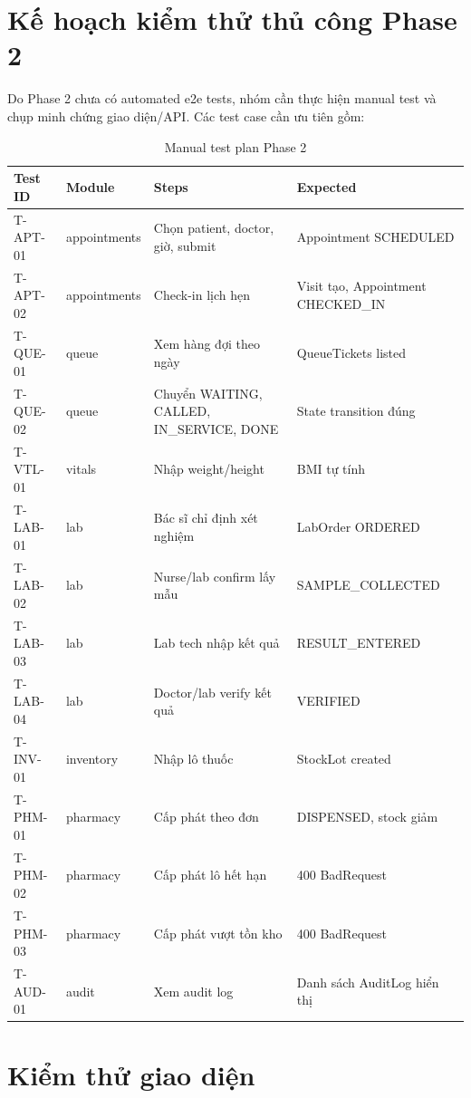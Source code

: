 \section{Kế hoạch kiểm thử thủ công Phase 2}

Do Phase 2 chưa có automated e2e tests, nhóm cần thực hiện manual test và chụp minh chứng giao diện/API. Các test case cần ưu tiên gồm:

\begin{longtable}{|p{2.5cm}|p{3cm}|p{5cm}|p{4.5cm}|}
\caption{Manual test plan Phase 2}\\
\hline
\textbf{Test ID} & \textbf{Module} & \textbf{Steps} & \textbf{Expected} \\
\hline
T-APT-01 & appointments & Chọn patient, doctor, giờ, submit & Appointment SCHEDULED \\
\hline
T-APT-02 & appointments & Check-in lịch hẹn & Visit tạo, Appointment CHECKED\_IN \\
\hline
T-QUE-01 & queue & Xem hàng đợi theo ngày & QueueTickets listed \\
\hline
T-QUE-02 & queue & Chuyển WAITING, CALLED, IN\_SERVICE, DONE & State transition đúng \\
\hline
T-VTL-01 & vitals & Nhập weight/height & BMI tự tính \\
\hline
T-LAB-01 & lab & Bác sĩ chỉ định xét nghiệm & LabOrder ORDERED \\
\hline
T-LAB-02 & lab & Nurse/lab confirm lấy mẫu & SAMPLE\_COLLECTED \\
\hline
T-LAB-03 & lab & Lab tech nhập kết quả & RESULT\_ENTERED \\
\hline
T-LAB-04 & lab & Doctor/lab verify kết quả & VERIFIED \\
\hline
T-INV-01 & inventory & Nhập lô thuốc & StockLot created \\
\hline
T-PHM-01 & pharmacy & Cấp phát theo đơn & DISPENSED, stock giảm \\
\hline
T-PHM-02 & pharmacy & Cấp phát lô hết hạn & 400 BadRequest \\
\hline
T-PHM-03 & pharmacy & Cấp phát vượt tồn kho & 400 BadRequest \\
\hline
T-AUD-01 & audit & Xem audit log & Danh sách AuditLog hiển thị \\
\hline
\end{longtable}

\section{Kiểm thử giao diện}

